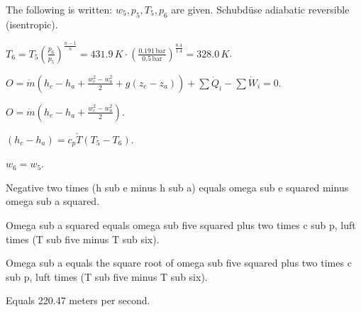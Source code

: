 The following is written:  
\( w_5, p_5, T_5, p_6 \) are given.  
Schubdüse adiabatic reversible (isentropic).  

\( T_6 = T_5 \left( \frac{p_6}{p_5} \right)^{\frac{n-1}{n}} = 431.9 \, K \cdot \left( \frac{0.191 \, \text{bar}}{0.5 \, \text{bar}} \right)^{\frac{0.4}{1.4}} = 328.0 \, K \).  

\( O = \dot{m} \left( h_c - h_a + \frac{w_c^2 - w_a^2}{2} + g(z_c - z_a) \right) + \sum \dot{Q}_i - \sum \dot{W}_i = 0 \).  

\( O = \dot{m} \left( h_c - h_a + \frac{w_c^2 - w_a^2}{2} \right) \).  

\( (h_c - h_a) = c_p \dot{T} \left( T_5 - T_6 \right) \).  

\( w_6 = w_5 \).

Negative two times (h sub e minus h sub a) equals omega sub e squared minus omega sub a squared.  

Omega sub a squared equals omega sub five squared plus two times c sub p, luft times (T sub five minus T sub six).  

Omega sub a equals the square root of omega sub five squared plus two times c sub p, luft times (T sub five minus T sub six).  

Equals 220.47 meters per second.